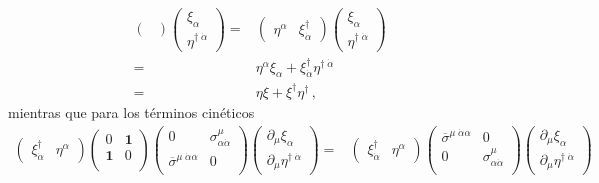 \begin{frame}
\begin{align}
\begin{pmatrix}
  \end{pmatrix} \begin{pmatrix}
   \xi_{\alpha}\\
   \eta^{\dagger\;\dot{\alpha}}    
  \end{pmatrix}
=&
\begin{pmatrix}
  \eta^{\alpha} & \xi^{\dagger}_{\dot{\alpha}}
\end{pmatrix}
\begin{pmatrix}
   \xi_{\alpha}\\
   \eta^{\dagger\;\dot{\alpha}}    
  \end{pmatrix}
\nonumber\\
=&\eta^{\alpha}\xi_{\alpha} +\xi^{\dagger}_{\dot{\alpha}}\eta^{\dagger\;\dot{\alpha}}\nonumber\\
=&\eta\xi+\xi^{\dagger}\eta^{\dagger}\,,
\end{align}
mientras que para los términos cinéticos
\begin{align}
\label{eq:psidd}
  \begin{pmatrix}
  \xi^{\dagger}_{\dot{\alpha}}& \eta^{\alpha}
  \end{pmatrix}
 \begin{pmatrix}
    0           &\boldsymbol{1}\\
    \boldsymbol{1} &0\\
  \end{pmatrix}
  \begin{pmatrix}
    0           &\sigma^{\mu}_{\alpha\dot{\alpha}}\\
    \overline{\sigma}^{\mu\;\dot{\alpha}\alpha} &0\\
  \end{pmatrix} \begin{pmatrix}
   \partial_{\mu}\xi_{\alpha}\\
   \partial_{\mu}\eta^{\dagger\;\dot{\alpha}}    
  \end{pmatrix}
=&
 \begin{pmatrix}
  \xi^{\dagger}_{\dot{\alpha}}& \eta^{\alpha}
  \end{pmatrix}
  \begin{pmatrix}
    \overline{\sigma}^{\mu\;\dot{\alpha}\alpha}&0\\
     0                    &\sigma^{\mu}_{\alpha\dot{\alpha}}\\
  \end{pmatrix} \begin{pmatrix}
   \partial_{\mu}\xi_{\alpha}\\
   \partial_{\mu}\eta^{\dagger\;\dot{\alpha}}    

\end{pmatrix}
\end{align}
\end{frame}
